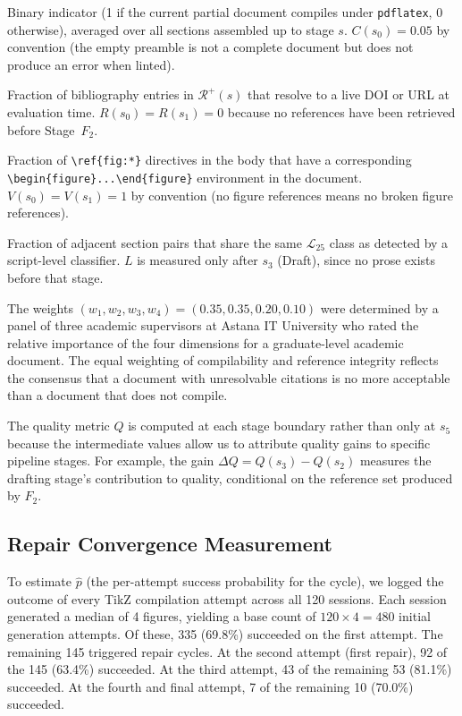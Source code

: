 \begin{description}[leftmargin=2.4em, style=nextline]
  \item[$C(s)$ — Compilability.]
    Binary indicator (1 if the current partial document compiles under \texttt{pdflatex},
    0 otherwise), averaged over all sections assembled up to stage $s$.
    $C(s_0)=0.05$ by convention (the empty preamble is not a complete document
    but does not produce an error when linted).
  \item[$R(s)$ — Reference Integrity.]
    Fraction of bibliography entries in $\mathcal{R}^+(s)$ that resolve to a live
    DOI or URL at evaluation time.
    $R(s_0)=R(s_1)=0$ because no references have been retrieved before Stage~$F_2$.
  \item[$V(s)$ — Visual Coherence.]
    Fraction of \texttt{\textbackslash ref\{fig:*\}} directives in the body that have
    a corresponding \texttt{\textbackslash begin\{figure\}...\textbackslash end\{figure\}}
    environment in the document.
    $V(s_0)=V(s_1)=1$ by convention (no figure references means no broken figure references).
  \item[$L(s)$ — Language Consistency.]
    Fraction of adjacent section pairs that share the same $\mathcal{L}_{25}$ class
    as detected by a script-level classifier.
    $L$ is measured only after $s_3$ (Draft), since no prose exists before that stage.
\end{description}

The weights $(w_1,w_2,w_3,w_4)=(0.35,0.35,0.20,0.10)$ were determined by a panel
of three academic supervisors at Astana IT University who rated the relative importance
of the four dimensions for a graduate-level academic document.
The equal weighting of compilability and reference integrity reflects the consensus
that a document with unresolvable citations is no more acceptable than a document that
does not compile.

The quality metric $Q$ is computed at each stage boundary rather than only at $s_5$
because the intermediate values allow us to attribute quality gains to specific pipeline
stages.
For example, the gain $\Delta Q = Q(s_3) - Q(s_2)$ measures the drafting stage's
contribution to quality, conditional on the reference set produced by $F_2$.

\subsection{Repair Convergence Measurement}

To estimate $\hat{p}$ (the per-attempt success probability for the \tvg{} cycle),
we logged the outcome of every TikZ compilation attempt across all 120 sessions.
Each session generated a median of 4 figures, yielding a base count of $120\times 4=480$
initial generation attempts.
Of these, 335 (69.8\%) succeeded on the first attempt.
The remaining 145 triggered repair cycles.
At the second attempt (first repair), 92 of the 145 (63.4\%) succeeded.
At the third attempt, 43 of the remaining 53 (81.1\%) succeeded.
At the fourth and final attempt, 7 of the remaining 10 (70.0\%) succeeded.

